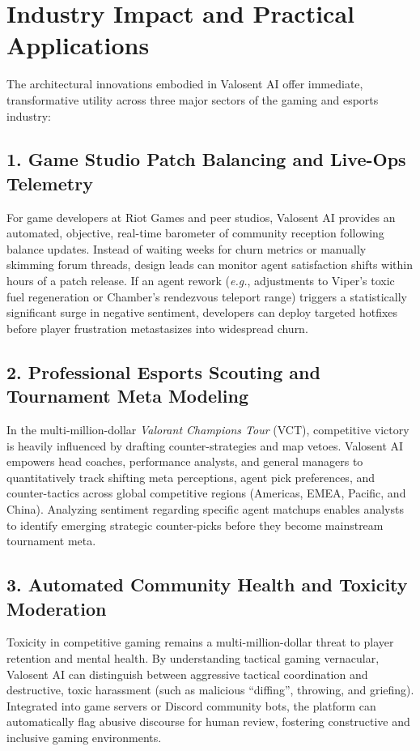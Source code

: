 \section{Industry Impact and Practical Applications}
\label{sec:industry_impact}

The architectural innovations embodied in Valosent AI offer immediate, transformative utility across three major sectors of the gaming and esports industry:

\subsection{1. Game Studio Patch Balancing and Live-Ops Telemetry}
For game developers at Riot Games and peer studios, Valosent AI provides an automated, objective, real-time barometer of community reception following balance updates. Instead of waiting weeks for churn metrics or manually skimming forum threads, design leads can monitor agent satisfaction shifts within hours of a patch release. If an agent rework (\textit{e.g.}, adjustments to Viper's toxic fuel regeneration or Chamber's rendezvous teleport range) triggers a statistically significant surge in negative sentiment, developers can deploy targeted hotfixes before player frustration metastasizes into widespread churn.

\subsection{2. Professional Esports Scouting and Tournament Meta Modeling}
In the multi-million-dollar \textit{Valorant Champions Tour} (VCT), competitive victory is heavily influenced by drafting counter-strategies and map vetoes. Valosent AI empowers head coaches, performance analysts, and general managers to quantitatively track shifting meta perceptions, agent pick preferences, and counter-tactics across global competitive regions (Americas, EMEA, Pacific, and China). Analyzing sentiment regarding specific agent matchups enables analysts to identify emerging strategic counter-picks before they become mainstream tournament meta.

\subsection{3. Automated Community Health and Toxicity Moderation}
Toxicity in competitive gaming remains a multi-million-dollar threat to player retention and mental health. By understanding tactical gaming vernacular, Valosent AI can distinguish between aggressive tactical coordination and destructive, toxic harassment (such as malicious ``diffing'', throwing, and griefing). Integrated into game servers or Discord community bots, the platform can automatically flag abusive discourse for human review, fostering constructive and inclusive gaming environments.

